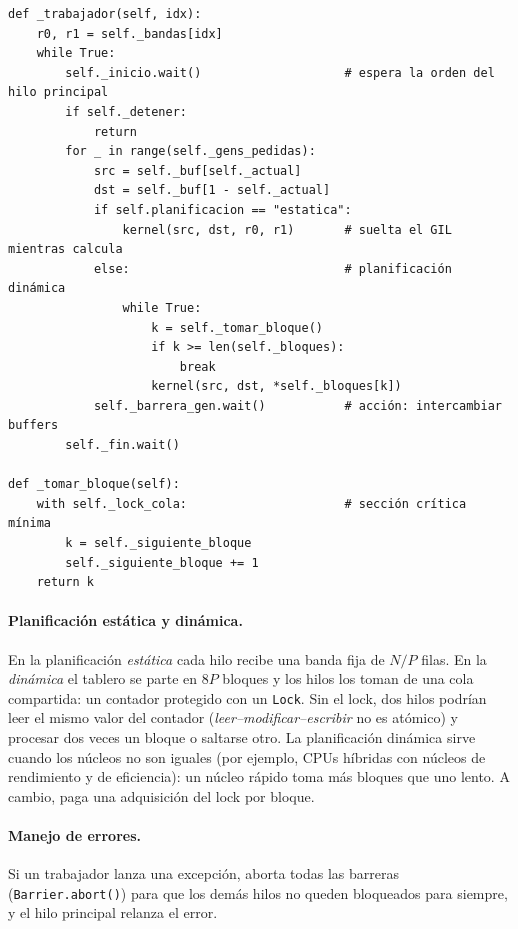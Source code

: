 \documentclass[11pt,a4paper]{article}
\newcommand{\code}[1]{\texttt{#1}}
\begin{document}
\begin{lstlisting}[caption={Bucle de cada hilo trabajador (extracto de \code{vida/motor\_hilos.py}).}]
def _trabajador(self, idx):
    r0, r1 = self._bandas[idx]
    while True:
        self._inicio.wait()                    # espera la orden del hilo principal
        if self._detener:
            return
        for _ in range(self._gens_pedidas):
            src = self._buf[self._actual]
            dst = self._buf[1 - self._actual]
            if self.planificacion == "estatica":
                kernel(src, dst, r0, r1)       # suelta el GIL mientras calcula
            else:                              # planificación dinámica
                while True:
                    k = self._tomar_bloque()
                    if k >= len(self._bloques):
                        break
                    kernel(src, dst, *self._bloques[k])
            self._barrera_gen.wait()           # acción: intercambiar buffers
        self._fin.wait()

def _tomar_bloque(self):
    with self._lock_cola:                      # sección crítica mínima
        k = self._siguiente_bloque
        self._siguiente_bloque += 1
    return k
\end{lstlisting}

\paragraph{Planificación estática y dinámica.} En la planificación \emph{estática} cada hilo recibe una banda fija
de $N/P$ filas. En la \emph{dinámica} el tablero se parte en $8P$ bloques y los hilos los toman de una cola
compartida: un contador protegido con un \code{Lock}. Sin el lock, dos hilos podrían leer el mismo valor del
contador (\emph{leer--modificar--escribir} no es atómico) y procesar dos veces un bloque o saltarse otro.
La planificación dinámica sirve cuando los núcleos no son iguales (por ejemplo, CPUs híbridas con núcleos de
rendimiento y de eficiencia): un núcleo rápido toma más bloques que uno lento. A cambio, paga una adquisición
del lock por bloque.

\paragraph{Manejo de errores.} Si un trabajador lanza una excepción, aborta todas las barreras
(\code{Barrier.abort()}) para que los demás hilos no queden bloqueados para siempre, y el hilo principal
relanza el error.
\end{document}
